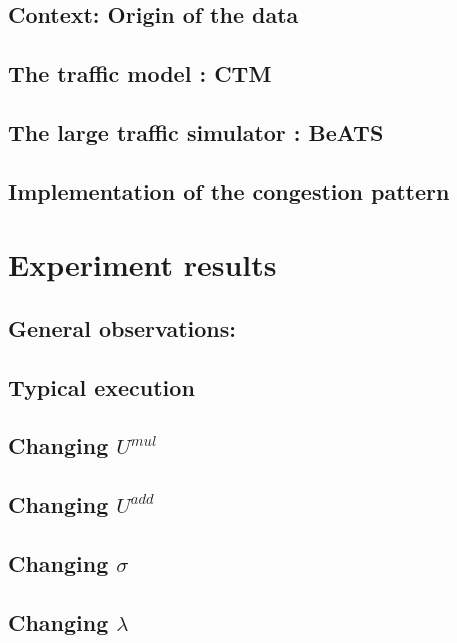 \subsection{Context: Origin of the data}
\label{subsec:pems}

\subsection{The traffic model : CTM}
\label{ctm}

\subsection{The large traffic simulator : BeATS}
\label{subsec:beats}

\subsection{Implementation of the congestion pattern}
\label{subsec:cpimplementation}







\section{Experiment results}
\subsection{General observations:}
\label{subsec:results_intro}

\subsection{Typical execution}
\label{subsec:typical}

\subsection{Changing $U^{mul}$}
\label{subsec:umul}

\subsection{Changing $U^{add}$}
\label{subsec:uadd}

\subsection{Changing $\sigma$}
\label{subsec:sigma}

\subsection{Changing $\lambda$}
\label{subsec:lambda}

